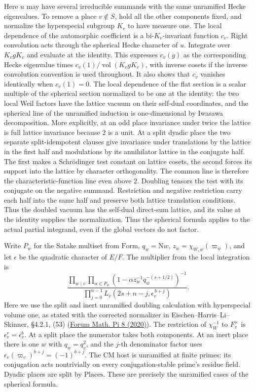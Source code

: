 Here $u$ may have several irreducible summands with the same
unramified Hecke eigenvalues. To remove a place $v\notin S$,
hold all the other components fixed, and normalize the hyperspecial
subgroup $K_v$ to have measure one. The local dependence of the
automorphic coefficient is a bi-$K_v$-invariant function $c_v$.
Right convolution acts through the spherical Hecke character of
$u$. Integrate over $K_v g K_v$ and evaluate at the identity.
This expresses $c_v(g)$ as the corresponding Hecke eigenvalue
times $c_v(1)/\operatorname{vol}(K_vgK_v)$, with inverse cosets
if the inverse convolution convention is used throughout. It also
shows that $c_v$ vanishes identically when $c_v(1)=0$.
The local dependence of the flat section is a scalar multiple of
the spherical section normalized to be one at the identity: the
two local Weil factors have the lattice vacuum on their self-dual
coordinates, and the spherical line of the unramified induction is
one-dimensional by Iwasawa decomposition. More explicitly, at an
odd place invariance under twice the lattice is full lattice
invariance because $2$ is a unit. At a split dyadic place the
two separate split-idempotent clauses give invariance under
translations by the lattice in the first half and modulations by its
annihilator lattice in the conjugate half. The first makes a
Schr\"odinger test constant on lattice cosets, the second forces
its support into the lattice by character orthogonality. The common
line is therefore the characteristic-function line even above $2$.
Doubling tensors the test with its conjugate on the negative
summand. Restriction and negative restriction carry each half into
the same half and preserve both lattice translation conditions.
Thus the doubled vacuum has the self-dual direct-sum lattice, and
its value at the identity supplies the normalization. Thus the spherical formula applies to the
actual partial integrand, even if the global vectors do not factor.

Write $P_w$ for the Satake multiset from $\mathrm{Form}$,
$q_w=\mathrm{N}w$, $z_w=\chi_{W,w}(\varpi_w)$, and let
$\epsilon$ be the quadratic character of $E/F$. The multiplier from
the local integration is
\[
 \frac{\displaystyle\prod_{w\mid v}\prod_{\alpha\in P_w}
              (1-\alpha z_w^{-1}q_w^{-(s+1/2)})^{-1}}
      {\displaystyle\prod_{j=0}^{n-1}
          L_v(2s+n-j,\epsilon_v^{\,b+j})}.
\]
Here we use the split and inert unramified doubling calculation
with hyperspecial volume one, as stated with the corrected
normalizer in Eischen--Harris--Li--Skinner, \S4.2.1, (53)
(\href{https://doi.org/10.1017/fmp.2020.4}{Forum Math. Pi 8 (2020)}).
The restriction of $\chi_W^{-1}$ to $F_v^\times$ is
$\epsilon_v^r=\epsilon_v^b$. At a split place the numerator takes
both components. At an inert place there is one $w$ with $q_w=q_v^2$,
and the $j$-th denominator factor uses
$\epsilon_v(\varpi_v)^{b+j}=(-1)^{b+j}$. The CM host is unramified at
finite primes: its conjugation acts nontrivially on every
conjugation-stable prime's residue field. Dyadic places are split
by $\mathrm{Places}$. These are precisely the unramified cases of
the spherical formula.

